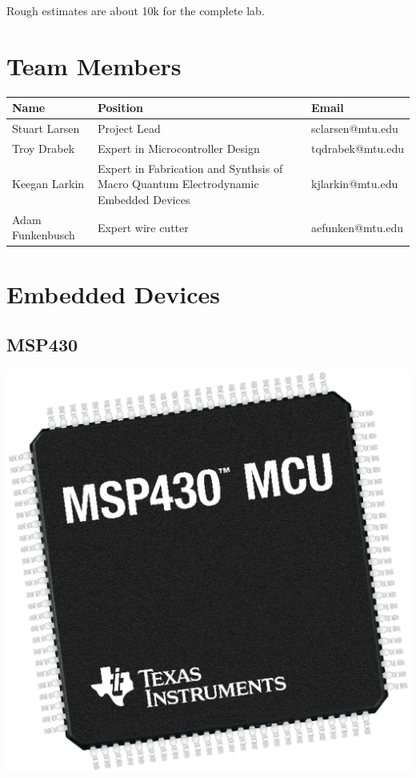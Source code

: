 \documentclass[12pt]{article}
\begin{document}
\noindent
Rough estimates are about 10k for the complete lab. 


\section{Team Members}
\begin{center}
  \begin{tabular}{  l | p{8cm} | l }
    Name & Position & Email \\
    \hline
    Stuart Larsen & Project Lead & sclarsen@mtu.edu \\ 
    Troy Drabek & Expert in Microcontroller Design & tqdrabek@mtu.edu \\
    Keegan Larkin & Expert in Fabrication and Synthsis of Macro Quantum Electrodynamic Embedded Devices  & kjlarkin@mtu.edu \\
    Adam Funkenbusch & Expert wire cutter & aefunken@mtu.edu \\

  \end{tabular}
\end{center}

\section{Embedded Devices}

\subsection{MSP430}
\begin{center}
  \includegraphics[scale=0.25]{images/msp430image}
\end{center}
\end{document}
